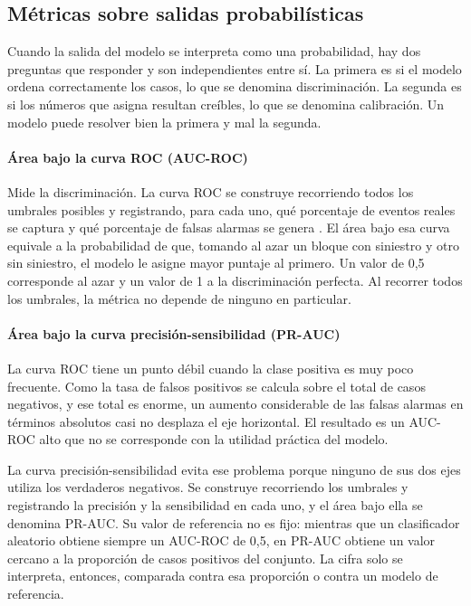 \subsection{Métricas sobre salidas probabilísticas}

Cuando la salida del modelo se interpreta como una probabilidad, hay dos preguntas que responder y son independientes entre sí. La primera es si el modelo ordena correctamente los casos, lo que se denomina discriminación. La segunda es si los números que asigna resultan creíbles, lo que se denomina calibración. Un modelo puede resolver bien la primera y mal la segunda.

\paragraph{Área bajo la curva ROC (AUC-ROC)}

Mide la discriminación. La curva ROC se construye recorriendo todos los umbrales posibles y registrando, para cada uno, qué porcentaje de eventos reales se captura y qué porcentaje de falsas alarmas se genera \parencite{fawcett2006}. El área bajo esa curva equivale a la probabilidad de que, tomando al azar un bloque con siniestro y otro sin siniestro, el modelo le asigne mayor puntaje al primero. Un valor de 0,5 corresponde al azar y un valor de 1 a la discriminación perfecta. Al recorrer todos los umbrales, la métrica no depende de ninguno en particular.

\paragraph{Área bajo la curva precisión-sensibilidad (PR-AUC)}

La curva ROC tiene un punto débil cuando la clase positiva es muy poco frecuente. Como la tasa de falsos positivos se calcula sobre el total de casos negativos, y ese total es enorme, un aumento considerable de las falsas alarmas en términos absolutos casi no desplaza el eje horizontal. El resultado es un AUC-ROC alto que no se corresponde con la utilidad práctica del modelo.

La curva precisión-sensibilidad evita ese problema porque ninguno de sus dos ejes utiliza los verdaderos negativos. Se construye recorriendo los umbrales y registrando la precisión y la sensibilidad en cada uno, y el área bajo ella se denomina PR-AUC. Su valor de referencia no es fijo: mientras que un clasificador aleatorio obtiene siempre un AUC-ROC de 0,5, en PR-AUC obtiene un valor cercano a la proporción de casos positivos del conjunto. La cifra solo se interpreta, entonces, comparada contra esa proporción o contra un modelo de referencia.

